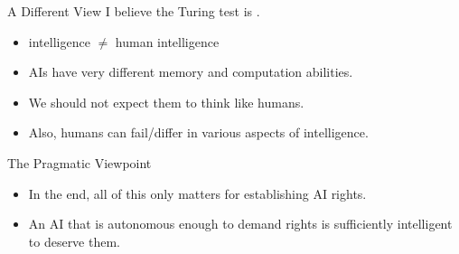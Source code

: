 \documentclass[xcolor={usenames,svgnames,x11names,dvipsnames,table}]{beamer}
\begin{document}
\begin{frame}{A Different View}
    I believe the Turing test is .
    \begin{itemize}
        \item intelligence $\neq$ human intelligence
        \item AIs have very different memory and computation abilities.
        \item We should not expect them to think like humans.
        \item Also, humans can fail\slash differ in various aspects of intelligence.\\
    \end{itemize}

    \pause
    \begin{block}{The Pragmatic Viewpoint}
        \begin{itemize}
            \item In the end, all of this only matters for establishing AI rights.
            \item An AI that is autonomous enough to demand rights is sufficiently intelligent to deserve them.
        \end{itemize}
    \end{block}
\end{frame}
\end{document}
